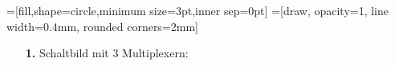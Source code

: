 \documentclass[a4paper,10pt]{scrartcl}
\author{\authorinfo}
\title{\titleinfo}
\date{\today}
\begin{document}
\setcounter{secnumdepth}{0}
\maketitle

\setcounter{MaxMatrixCols}{31}


=[fill,shape=circle,minimum size=3pt,inner sep=0pt]
=[draw, opacity=1, line width=0.4mm, rounded corners=2mm]

\newcommand*{\oline}[1]{\overline{\vphantom{A}#1}}

\begin{enumerate}
    \item[\textbf{1.}]
        Schaltbild mit 3 Multiplexern:


\end{enumerate}
\end{document}
